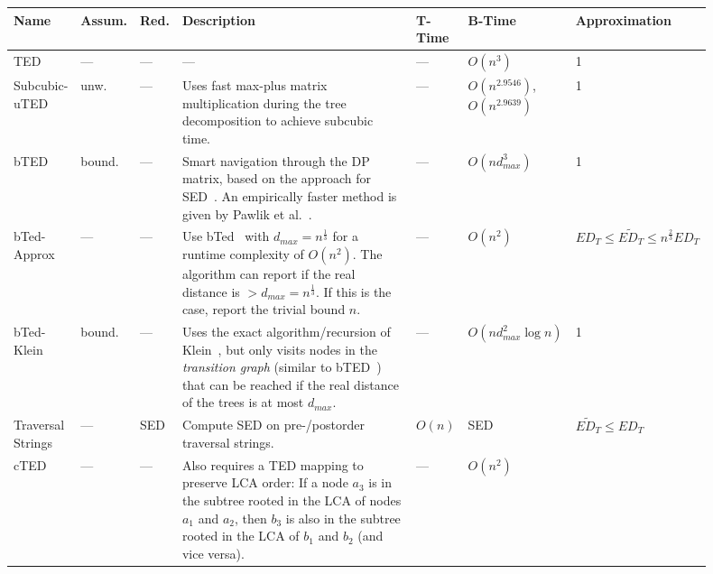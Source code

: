 \documentclass{article}
\begin{document}
\begin{footnotesize}
    \begin{longtable}[c]{p{0.085\linewidth}p{0.05\linewidth}p{0.035\linewidth}p{0.43\linewidth}p{0.05\linewidth}p{0.1\linewidth}p{0.15\linewidth}}
        \toprule
        Name    &   Assum.  & Red.  &   Description  &   T-Time   &   B-Time    &   Approximation   \tabularnewline
        \midrule\endhead
        TED &  --- &   ---  & --- &   ---  &   $O(n^3)$    &   1   \tabularnewline
        Subcubic-uTED~\cite{DBLP:conf/focs/Mao21} &
        unw.&
        --- &
        Uses fast max-plus matrix multiplication during the tree decomposition to achieve subcubic time. &
        --- &
        $O(n^{2.9546})$, $O(n^{2.9639})$    &
        1
        \tabularnewline
        bTED~\cite{DBLP:conf/cpm/Touzet05,DBLP:conf/cikm/0001A20}&
        bound.&
        ---&
        Smart navigation through the DP matrix, based on the approach for SED~\cite{DBLP:journals/siamcomp/LandauMS98}. An empirically faster method is given by Pawlik et al.~\cite{DBLP:conf/cikm/0001A20}.&
        ---&
        $O(nd_{max}^3)$&
        1
        \tabularnewline
        bTed-Approx~\cite{DBLP:conf/stoc/BoroujeniGHS19}&
        ---&
        ---&
        Use bTed~\cite{DBLP:conf/cpm/Touzet05} with $d_{max}=n^{\frac{1}{3}}$ for a runtime complexity of $O(n^2)$. The algorithm can report if the real distance is ${>}d_{max}=n^{\frac{1}{3}}$. If this is the case, report the trivial bound $n$.&
        ---&
        $O(n^2)$&
        $ED_T \leq \widetilde{ED_T}\leq n^{\frac{2}{3}}ED_T$
        \tabularnewline
        bTed-Klein~\cite{DBLP:conf/icalp/AkmalJ21}&
        bound.&
        ---&
        Uses the exact algorithm/recursion of Klein~\cite{DBLP:conf/esa/Klein98}, but only visits nodes in the \textit{transition graph} (similar to bTED~\cite{DBLP:conf/cpm/Touzet05}) that can be reached if the real distance of the trees is at most $d_{max}$.&
        ---&
        $O(nd_{max}^2\log n)$&
        1
        \tabularnewline
        Traversal Strings~\cite{DBLP:conf/sigmod/GuhaJKSY02}&
        ---&
        SED&
        Compute SED on pre-/postorder traversal strings.&
        $O(n)$&
        SED&
        $\widetilde{ED_T}\leq ED_T$
        \tabularnewline
        cTED~\cite{DBLP:conf/sigmod/GuhaJKSY02,DBLP:conf/cpm/Zhang93}&
        ---&
        ---&
        Also requires a TED mapping to preserve LCA order: If a node $a_3$ is in the subtree rooted in the LCA of nodes $a_1$ and $a_2$, then $b_3$ is also in the subtree rooted in the LCA of $b_1$ and $b_2$ (and vice versa).&
        ---&
        $O(n^2)$&

\end{longtable}
\end{footnotesize}
\end{document}
